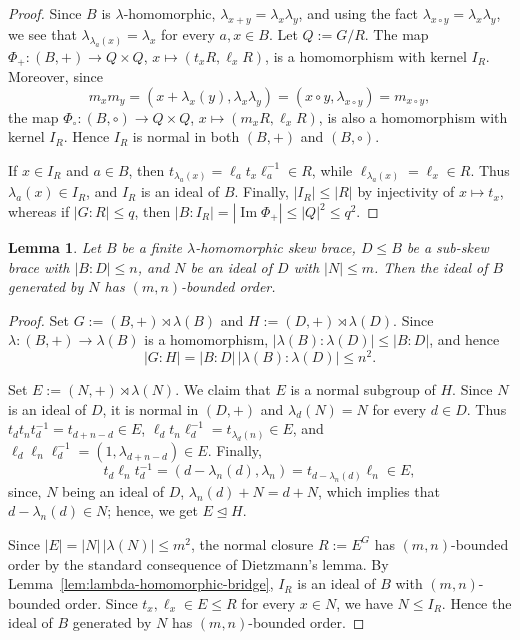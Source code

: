 \documentclass[10pt,a4paper]{amsart}
\numberwithin{equation}{section}
\newtheorem{lem}[equation]{Lemma}
\begin{document}
\begin{proof}
Since $B$ is $\lambda$-homomorphic, $\lambda_{x+y}=\lambda_x\lambda_y$, and using the fact  $\lambda_{x\circ y}=\lambda_x\lambda_y$, we see that $\lambda_{\lambda_a(x)}=\lambda_x$  for every $a, x\in B$.
Let $Q:=G/R$. The map $\Phi_+:(B,+)\to Q\times Q$, $x\mapsto(t_xR,\ell_xR)$, is a homomorphism with kernel $I_R$. Moreover, since
$$
m_xm_y=(x+\lambda_x(y),\lambda_x\lambda_y)=(x\circ y,\lambda_{x\circ y})=m_{x\circ y},
$$
the map $\Phi_\circ:(B,\circ)\to Q\times Q$, $x\mapsto(m_xR,\ell_xR)$, is also a homomorphism with kernel $I_R$. Hence $I_R$ is normal in both $(B,+)$ and $(B,\circ)$.

If $x\in I_R$ and $a\in B$, then $t_{\lambda_a(x)}=\ell_at_x\ell_a^{-1}\in R$, while $\ell_{\lambda_a(x)}=\ell_x\in R$. Thus $\lambda_a(x)\in I_R$, and $I_R$ is an ideal of $B$. Finally, $|I_R|\leqslant |R|$ by injectivity of $x\mapsto t_x$, whereas if $|G:R|\leqslant q$, then $|B:I_R|=|\operatorname{Im}\Phi_+|\leqslant |Q|^2\leqslant q^2$.
\end{proof}

\begin{lem}\label{lem:bounded-ideal-closure-lambda-homomorphic}
Let $B$ be a finite $\lambda$-homomorphic skew brace,  $D\leqslant B$ be a sub-skew brace with $|B:D|\leqslant n$, and $N$ be an ideal of $D$ with $|N|\leqslant m$. Then the ideal of $B$ generated by $N$ has $(m,n)$-bounded order.
\end{lem}

\begin{proof}
Set $G :=(B,+)\rtimes\lambda(B)$ and $H:=(D,+)\rtimes\lambda(D)$. Since $\lambda:(B,+)\to\lambda(B)$ is a homomorphism, $|\lambda(B):\lambda(D)|\leqslant |B:D|$, and hence
$$
|G:H|=|B:D|\,|\lambda(B):\lambda(D)|\leqslant n^2.
$$

Set $E:=(N,+)\rtimes\lambda(N)$. We claim that $E$ is a normal subgroup of $H$. Since $N$ is an ideal of $D$, it is normal in $(D,+)$ and $\lambda_d(N)=N$ for every $d\in D$. Thus $t_dt_nt_d^{-1}=t_{d+n-d}\in E$, $\ell_dt_n\ell_d^{-1}=t_{\lambda_d(n)}\in E$, and $\ell_d\ell_n\ell_d^{-1}=(1,\lambda_{d+n-d})\in E$. Finally,
$$
t_d\ell_nt_d^{-1}=(d-\lambda_n(d),\lambda_n)=t_{d-\lambda_n(d)}\ell_n\in E,
$$
since, $N$ being an ideal of $D$, $\lambda_n(d)+N=d+N$, which implies that  $d-\lambda_n(d)\in N$; hence, we get $E\unlhd H$.

Since $|E|=|N|\,|\lambda(N)|\leqslant m^2$, the normal closure $R:=E^G$ has $(m,n)$-bounded order by the standard consequence of Dietzmann's lemma. By Lemma~\ref{lem:lambda-homomorphic-bridge}, $I_R$ is an ideal of $B$ with $(m,n)$-bounded order. Since $t_x,\ell_x\in E\leqslant R$ for every $x\in N$, we have $N\leqslant I_R$. Hence the ideal of $B$ generated by $N$ has $(m,n)$-bounded order.
\end{proof}
\end{document}
